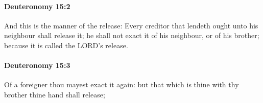 		\paragraph{Deuteronomy 15:2} %
			\label{DEUTERONOMY-15-2}

			And this is the manner of the release: Every creditor that lendeth ought unto his neighbour shall release it; he shall not exact it of his neighbour, or of his brother; because it is called the LORD's release.


		\paragraph{Deuteronomy 15:3} %
			\label{DEUTERONOMY-15-3}

			Of a foreigner thou mayest exact it again: but that which is thine with thy brother thine hand shall release;


